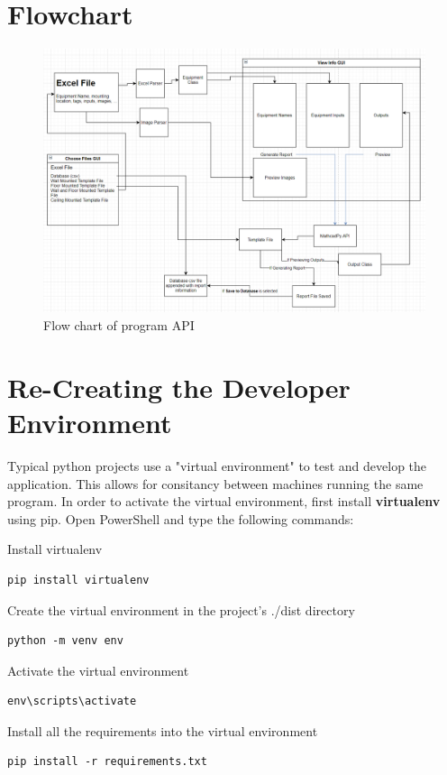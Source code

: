 \documentclass[11pt]{article}
\begin{document}
\section{Flowchart}
\label{sec:orgbc8e948}
\begin{figure}[htbp]
\centering
\includegraphics[width=.9\linewidth]{./dist/documentation/component_flowchart.png}
\caption{\label{fig:org0c4abec}Flow chart of program API}
\end{figure}

\section{Re-Creating the Developer Environment}
\label{sec:org8804aab}
Typical python projects use a "virtual environment" to test and develop the application. This allows for consitancy between machines running the same program. In order to activate the virtual environment, first install \textbf{virtualenv} using pip. Open PowerShell and type the following commands:

Install virtualenv 
\begin{verbatim}
pip install virtualenv
\end{verbatim}

Create the virtual environment in the project's ./dist directory
\begin{verbatim}
python -m venv env
\end{verbatim}

Activate the virtual environment
\begin{verbatim}
env\scripts\activate
\end{verbatim}

Install all the requirements into the virtual environment
\begin{verbatim}
pip install -r requirements.txt
\end{verbatim}
\end{document}
